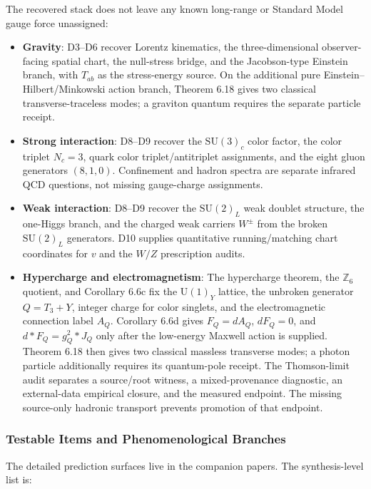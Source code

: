 The recovered stack does not leave any known long-range or Standard Model gauge force unassigned:
\begin{itemize}
\tightlist
\item \textbf{Gravity}: D3--D6 recover Lorentz kinematics, the three-dimensional observer-facing spatial chart, the null-stress bridge, and the Jacobson-type Einstein branch, with \(T_{ab}\) as the stress-energy source. On the additional pure Einstein--Hilbert/Minkowski action branch, Theorem 6.18 gives two classical transverse-traceless modes; a graviton quantum requires the separate particle receipt.
\item \textbf{Strong interaction}: D8--D9 recover the \(\mathrm{SU}(3)_c\) color factor, the color triplet \(N_c=3\), quark color triplet/antitriplet assignments, and the eight gluon generators \((8,1,0)\). Confinement and hadron spectra are separate infrared QCD questions, not missing gauge-charge assignments.
\item \textbf{Weak interaction}: D8--D9 recover the \(\mathrm{SU}(2)_L\) weak doublet structure, the one-Higgs branch, and the charged weak carriers \(W^\pm\) from the broken \(\mathrm{SU}(2)_L\) generators. D10 supplies quantitative running/matching chart coordinates for \(v\) and the \(W/Z\) prescription audits.
\item \textbf{Hypercharge and electromagnetism}: The hypercharge theorem, the \(\mathbb Z_6\) quotient, and Corollary 6.6c fix the \(\mathrm U(1)_Y\) lattice, the unbroken generator \(Q=T_3+Y\), integer charge for color singlets, and the electromagnetic connection label \(A_Q\). Corollary 6.6d gives \(F_Q=dA_Q\), \(dF_Q=0\), and \(d*F_Q=g_Q^2*J_Q\) only after the low-energy Maxwell action is supplied. Theorem 6.18 then gives two classical massless transverse modes; a photon particle additionally requires its quantum-pole receipt. The Thomson-limit audit separates a source/root witness, a mixed-provenance diagnostic, an external-data empirical closure, and the measured endpoint. The missing source-only hadronic transport prevents promotion of that endpoint.
\end{itemize}

\subsubsection{Testable Items and Phenomenological Branches}\label{83-novel-testable-predictions}

The detailed prediction surfaces live in the companion papers. The synthesis-level list is:

